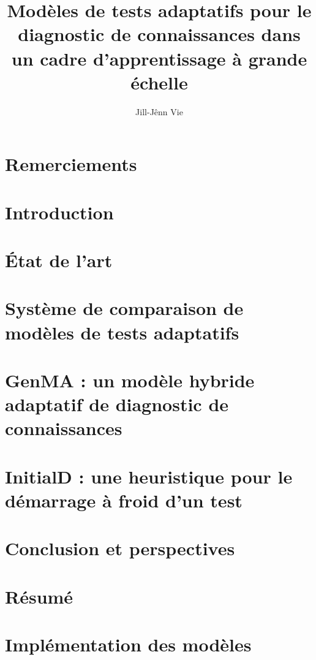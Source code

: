\documentclass[12pt,a4paper]{book}
\title{Modèles de tests adaptatifs pour le diagnostic de connaissances dans un cadre d'apprentissage à grande échelle}
\author{Jill-Jênn Vie}
\begin{document}

\restoregeometry

\chapter*{Remerciements}


\printnomenclature

\clearpage
\tableofcontents

\chapter{Introduction}


\chapter{État de l'art}


\chapter{Système de comparaison de modèles de tests adaptatifs}



\chapter{GenMA : un modèle hybride adaptatif de diagnostic de connaissances}




\chapter{InitialD : une heuristique pour le démarrage à froid d'un test}

%


\chapter{Conclusion et perspectives}


\chapter*{Résumé}


\clearpage
\listoffigures
\listoftables

\appendix

\chapter{Implémentation des modèles}


\printbibliography
\end{document}
